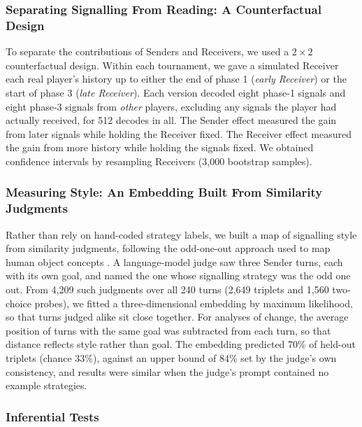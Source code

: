 \documentclass[stu,11pt,floatsintext,donotrepeattitle]{apa7}
\begin{document}
\subsubsection{Separating Signalling From Reading: A Counterfactual Design}

To separate the contributions of Senders and Receivers, we used a $2 \times 2$ counterfactual design. Within each tournament, we gave a simulated Receiver each real player's history up to either the end of phase 1 (\emph{early Receiver}) or the start of phase 3 (\emph{late Receiver}). Each version decoded eight phase-1 signals and eight phase-3 signals from \emph{other} players, excluding any signals the player had actually received, for 512 decodes in all. The Sender effect measured the gain from later signals while holding the Receiver fixed. The Receiver effect measured the gain from more history while holding the signals fixed. We obtained confidence intervals by resampling Receivers (3,000 bootstrap samples).

\subsubsection{Measuring Style: An Embedding Built From Similarity Judgments}

Rather than rely on hand-coded strategy labels, we built a map of signalling style from similarity judgments, following the odd-one-out approach used to map human object concepts \parencite{hebart2020}. A language-model judge saw three Sender turns, each with its own goal, and named the one whose signalling strategy was the odd one out. From 4,209 such judgments over all 240 turns (2,649 triplets and 1,560 two-choice probes), we fitted a three-dimensional embedding by maximum likelihood, so that turns judged alike sit close together. For analyses of change, the average position of turns with the same goal was subtracted from each turn, so that distance reflects style rather than goal. The embedding predicted 70\% of held-out triplets (chance 33\%), against an upper bound of 84\% set by the judge's own consistency, and results were similar when the judge's prompt contained no example strategies.

\subsubsection{Inferential Tests}
\end{document}
